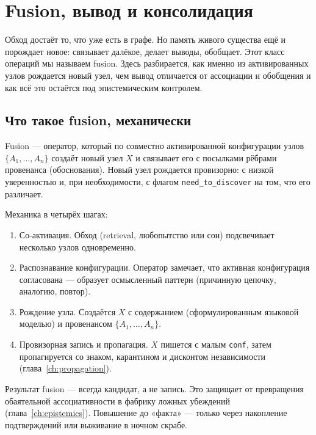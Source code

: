 \chapter{Fusion, вывод и консолидация}
\label{ch:fusion}

Обход достаёт то, что уже есть в графе. Но память живого существа ещё и
порождает новое: связывает далёкое, делает выводы, обобщает. Этот класс
операций мы называем fusion. Здесь разбирается, как именно из активированных
узлов рождается новый узел, чем вывод отличается от ассоциации и обобщения и
как всё это остаётся под эпистемическим контролем.

\section{Что такое fusion, механически}

\begin{definition}
Fusion --- оператор, который по совместно активированной конфигурации узлов
$\{A_1, \ldots, A_n\}$ создаёт новый узел $X$ и связывает его с посылками
рёбрами провенанса (обоснования). Новый узел рождается провизорно: с низкой
уверенностью и, при необходимости, с флагом \texttt{need\_to\_discover} на том,
что его различает.
\end{definition}

Механика в четырёх шагах:
\begin{enumerate}
\item Со-активация. Обход (retrieval, любопытство или сон) подсвечивает
несколько узлов одновременно.
\item Распознавание конфигурации. Оператор замечает, что активная конфигурация
согласована --- образует осмысленный паттерн (причинную цепочку, аналогию,
повтор).
\item Рождение узла. Создаётся $X$ с содержанием (сформулированным языковой
моделью) и провенансом $\{A_1, \ldots, A_n\}$.
\item Провизорная запись и пропагация. $X$ пишется с малым \texttt{conf},
затем пропагируется со знаком, карантином и дисконтом независимости
(глава~\ref{ch:propagation}).
\end{enumerate}

\begin{principle}
Результат fusion --- всегда кандидат, а не запись. Это защищает от превращения
обаятельной ассоциативности в фабрику ложных убеждений
(глава~\ref{ch:epistemics}). Повышение до «факта» --- только через накопление
подтверждений или выживание в ночном скрабе.
\end{principle}

